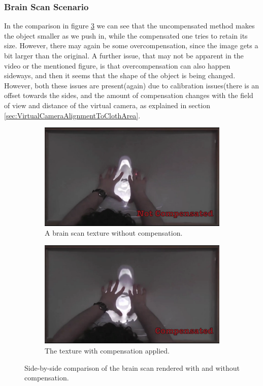 \documentclass[]{article}
\begin{document}
\subsubsection{Brain Scan Scenario}

In the comparison in figure \ref{fig:BrainScanComparison} we can see that the uncompensated method makes the object smaller as we push in, while the compensated one tries to retain its size. However, there may again be some overcompensation, since the image gets a bit larger than the original. A further issue, that may not be apparent in the video or the mentioned figure, is that overcompensation can also happen sideways, and then it seems that the shape of the object is being changed. However, both these issues are present(again) due to calibration issues(there is an offset towards the sides, and the amount of compensation changes with the field of view and distance of the virtual camera, as explained in section \ref{sec:VirtualCameraAlignmentToClothArea}.

\begin{figure}[!h]
\centering
\begin{subfigure}{.5\textwidth}
  \centering
  \includegraphics[width=0.9\linewidth]{figures/compensation/BrainScanNotCompensated.png}
  \caption{A brain scan texture without compensation.}
  \label{fig:BrainScanNotCompensated}
\end{subfigure}%
\begin{subfigure}{.5\textwidth}
  \centering
  \includegraphics[width=0.9\linewidth]{figures/compensation/BrainScanCompensated.png}
  \caption{The texture with compensation applied.}
  \label{fig:BrainScanCompensated}
\end{subfigure}
\caption{Side-by-side comparison of the brain scan rendered with and without compensation.}
\label{fig:BrainScanComparison}
\end{figure}
\end{document}
